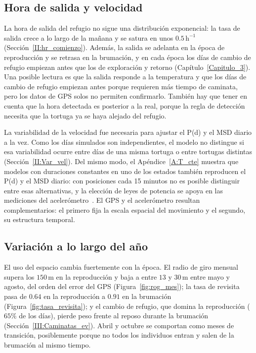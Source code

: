 \subsection{Hora de salida y velocidad}

La hora de salida del refugio no sigue una distribución exponencial: la tasa de salida crece a lo largo de la mañana y se satura en unos
$0.5\,\mathrm{h^{-1}}$ (Sección~\ref{II:hr_comienzo}). Además, la salida se adelanta en la época de reproducción y se retrasa en la brumación, y en cada
época los días de cambio de refugio empiezan antes que los de exploración y retorno (Capítulo~\ref{Capitulo_3}). Una posible lectura es que la salida
responde a la temperatura y que los días de cambio de refugio empiezan antes porque requieren más tiempo de caminata, pero los datos de GPS solos no
permiten confirmarlo. También hay que tener en cuenta que la hora detectada es posterior a la real, porque la regla de detección necesita que la tortuga
ya se haya alejado del refugio.

La variabilidad de la velocidad fue necesaria para ajustar el P(d) y el MSD diario a la vez. Como los días simulados son independientes, el modelo no
distingue si esa variabilidad ocurre entre días de una misma tortuga o entre tortugas distintas (Sección~\ref{II:Var_vel}). Del mismo modo, el
Apéndice~\ref{A:T_cte} muestra que modelos con duraciones constantes en uno de los estados también reproducen el P(d) y el MSD diario: con posiciones
cada 15 minutos no es posible distinguir entre esas alternativas, y la elección de leyes de potencia se apoya en las mediciones del
acelerómetro~\cite{callenbach2025}. El GPS y el acelerómetro resultan complementarios: el primero fija la escala espacial del movimiento y el segundo,
su estructura temporal.

\subsection{Variación a lo largo del año}

El uso del espacio cambia fuertemente con la época. El radio de giro mensual supera los $150\,\mathrm{m}$ en la reproducción y baja a entre $13$ y
$30\,\mathrm{m}$ entre mayo y agosto, del orden del error del GPS (Figura~\ref{fig:rog_mes}); la tasa de revisita pasa de $0.64$ en la reproducción a
$0.91$ en la brumación (Figura~\ref{fig:tasa_revisita}); y el cambio de refugio, que domina la reproducción ($65 \%$ de los días), pierde peso frente
al reposo durante la brumación (Sección~\ref{III:Caminatas_ev}). Abril y octubre se comportan como meses de transición, posiblemente porque no todos los
individuos entran y salen de la brumación al mismo tiempo.

